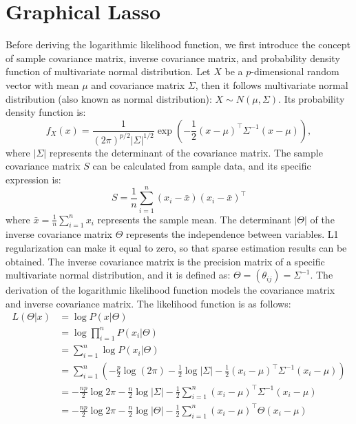 \chapter{Graphical Lasso}
Before deriving the logarithmic likelihood function, we first introduce the concept of sample covariance matrix, inverse covariance matrix, and probability density function of multivariate normal distribution.
Let \(X\) be a \(p\)-dimensional random vector with mean \(\mu\) and covariance matrix \(\Sigma\), then it follows multivariate normal distribution (also known as normal distribution): \(X \sim N(\mu, \Sigma)\). Its probability density function is:
\begin{equation*}
	f_X(x) = \frac{1}{(2\pi)^{p/2} |\Sigma|^{1/2}} \exp\left(-\frac{1}{2}(x-\mu)^{\top} \Sigma^{-1} (x-\mu)\right),
\end{equation*}
where \(|\Sigma|\) represents the determinant of the covariance matrix.
The sample covariance matrix \(S\) can be calculated from sample data, and its specific expression is:
\begin{equation*}
	S = \frac{1}{n} \sum_{i=1}^n (x_i - \bar{x})(x_i - \bar{x})^{\top}
\end{equation*}
where \(\bar{x}=\frac{1}{n} \sum_{i=1}^n x_i\) represents the sample mean.
The determinant \(|\Theta|\) of the inverse covariance matrix \(\Theta\) represents the independence between variables. L1 regularization can make it equal to zero, so that sparse estimation results can be obtained. The inverse covariance matrix is the precision matrix of a specific multivariate normal distribution, and it is defined as: \(\Theta = (\theta_{ij}) = \Sigma^{-1}\).
The derivation of the logarithmic likelihood function models the covariance matrix and inverse covariance matrix. The likelihood function is as follows:
\begin{equation*}
	\begin{aligned}
		L(\Theta|x) & =\log P(x|\Theta)                                                                                                                        \\
		            & =\log \prod_{i=1}^{n} P(x_i|\Theta)                                                                                                      \\
		            & =\sum_{i=1}^{n} \log P(x_i|\Theta)                                                                                                       \\
		            & =\sum_{i=1}^{n} \left( -\frac{p}{2} \log(2 \pi ) - \frac{1}{2} \log |\Sigma| -\frac{1}{2} (x_i-\mu)^{\top} \Sigma^{-1} (x_i-\mu) \right) \\
		            & =-\frac{np}{2} \log2\pi -\frac{n}{2} \log |\Sigma| -\frac{1}{2} \sum_{i=1}^{n} (x_i-\mu)^{\top} \Sigma^{-1} (x_i-\mu)                    \\
		            & =-\frac{np}{2} \log2\pi -\frac{n}{2} \log |\Theta| -\frac{1}{2} \sum_{i=1}^{n} (x_i-\mu)^{\top} \Theta (x_i-\mu)
	\end{aligned}
\end{equation*}
